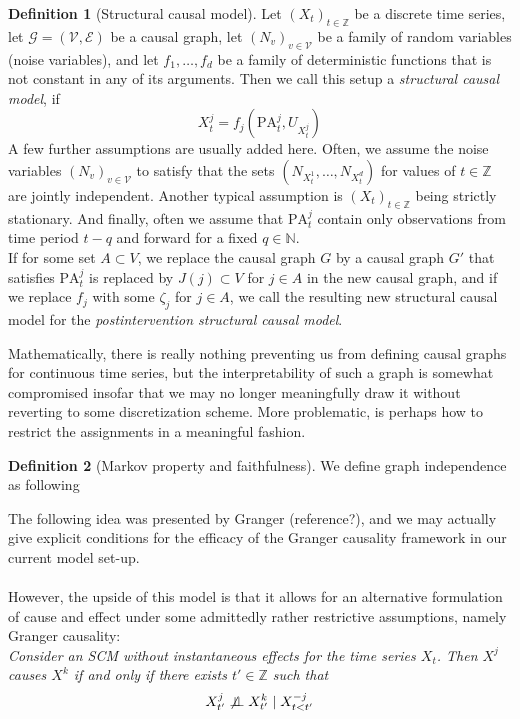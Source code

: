 \documentclass[11pt, a4paper]{memoir}
\theoremstyle{plain}
\theoremstyle{definition}
\newtheorem{defn}{Definition}
\newcommand{\mN}{\mathbb{N}}
\newcommand{\mZ}{\mathbb{Z}}
\newcommand{\indep}{\perp \!\!\! \perp}
\begin{document}
\begin{defn}[Structural causal model]
Let $(X_t)_{t\in \mZ}$ be a discrete time series, let $\mathcal{G}=(\mathcal{V},\mathcal{E})$ be a causal graph, let $(N_v)_{v\in \mathcal{V}}$ be a family of random variables (noise variables), and let $f_1,\ldots,f_d$ be a family of deterministic functions that is not constant in any of its arguments. Then we call this setup a \emph{structural causal model}, if
$$X_t^j=f_j(\text{PA}_t^j,U_{X_{t}^j})$$
A few further assumptions are usually added here. Often, we assume the noise variables $(N_v)_{v\in \mathcal{V}}$ to satisfy that the sets $(N_{X_t^1},\ldots,N_{X_t^{d}})$ for values of $t\in \mZ$ are jointly independent. Another typical assumption is $(X_t)_{t\in \mZ}$ being strictly stationary. And finally, often we assume that $\text{PA}_t^j$ contain only observations from time period $t-q$ and forward for a fixed $q\in \mN$.\\
If for some set $A\subset V$, we replace the causal graph $G$ by a causal graph $G'$ that satisfies $\text{PA}_t^j$ is replaced by $J(j)\subset V$ for $j\in A$ in the new causal graph, and if we replace $f_j$ with some $\zeta_j$ for $j\in A$, we call the resulting new structural causal model for the \textit{postintervention structural causal model}.
\end{defn}
Mathematically, there is really nothing preventing us from defining causal graphs for continuous time series, but the interpretability of such a graph is somewhat compromised insofar that we may no longer meaningfully draw it without reverting to some discretization scheme. More problematic, is perhaps how to restrict the assignments in a meaningful fashion.
\begin{defn}[Markov property and faithfulness]
We define graph independence as following
\end{defn}
The following idea was presented by Granger (reference?), and we may actually give explicit conditions for the efficacy of the Granger causality framework in our current model set-up.\\\\
However, the upside of this model is that it allows for an alternative formulation of cause and effect under some admittedly rather restrictive assumptions, namely Granger causality:\\
\textit{Consider an SCM without instantaneous effects for the time series $X_t$. Then $X^j$ causes $X^k$ if and only if there exists $t'\in \mZ$ such that
$$X_{t'}^j\centernot \indep X_{t'}^k\mid X_{t<t'}^{-j}$$}
\end{document}
